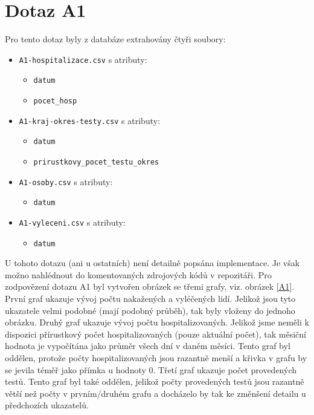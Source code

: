 \documentclass[12pt]{article}
\begin{document}
\section{Dotaz A1}
Pro tento dotaz byly z databáze extrahovány čtyři soubory:
\begin{itemize}
    \item \texttt{A1-hospitalizace.csv} s atributy:
        \begin{itemize}
            \item \texttt{datum}
            \item \texttt{pocet\_hosp}
        \end{itemize}
    \item \texttt{A1-kraj-okres-testy.csv} s atributy:
        \begin{itemize}
            \item \texttt{datum}
            \item \texttt{prirustkovy\_pocet\_testu\_okres}
        \end{itemize}
    \item \texttt{A1-osoby.csv} s atributy:
        \begin{itemize}
            \item \texttt{datum}
        \end{itemize}
    \item \texttt{A1-vyleceni.csv} s atributy:
        \begin{itemize}
            \item \texttt{datum}
        \end{itemize}
\end{itemize}

U tohoto dotazu (ani u ostatních) není detailně popsána implementace. Je však možno nahlédnout do komentovaných zdrojových kódů v repozitáři. Pro zodpovězení dotazu A1 byl vytvořen obrázek se třemi grafy, viz. obrázek \ref{A1}. První graf ukazuje vývoj počtu nakažených a vyléčených lidí. Jelikož jsou tyto ukazatele velmi podobné (mají podobný průběh), tak byly vloženy do jednoho obrázku. Druhý graf ukazuje vývoj počtu hospitalizovaných. Jelikož jsme neměli k dispozici přírustkový počet hospitalizovaných (pouze aktuální počet), tak měsiční hodnota je vypočítána jako průměr všech dní v daném měsíci. Tento graf byl oddělen, protože počty hospitalizovaných jsou razantně menší a křivka v grafu by se jevila téměř jako přímka u hodnoty 0. Třetí graf ukazuje počet provedených testů. Tento graf byl také oddělen, jelikož počty provedených testů jsou razantně větší než počty v prvním/druhém grafu a docházelo by tak ke změnšení detailu u předchozích ukazatelů.
\end{document}

